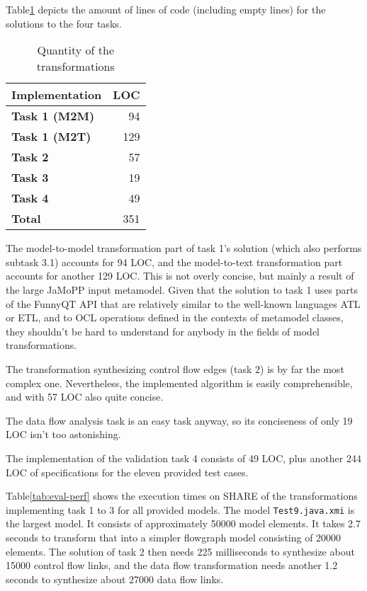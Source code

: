 \documentclass[11pt]{article}
\begin{document}
Table\ref{tab:eval-quantity} depicts the amount of lines of code (including
empty lines) for the solutions to the four tasks.

\begin{table}[h!]
  \centering
  \begin{tabular}{| l | r |}
    \hline
    \textbf{Implementation} & \textbf{LOC}\\
    \hline
    \textbf{Task 1 (M2M)} & 94\\
    \textbf{Task 1 (M2T)} & 129\\
    \textbf{Task 2} & 57\\
    \textbf{Task 3} & 19\\
    \textbf{Task 4} & 49\\
    \hline
    \textbf{Total} & 351\\
    \hline
  \end{tabular}
  \caption{Quantity of the transformations}
  \label{tab:eval-quantity}
\end{table}

The model-to-model transformation part of task 1's solution (which also
performs subtask 3.1) accounts for 94 LOC, and the model-to-text transformation
part accounts for another 129 LOC.  This is not overly concise, but mainly a
result of the large JaMoPP input metamodel.  Given that the solution to task 1
uses parts of the FunnyQT API that are relatively similar to the well-known
languages ATL or ETL, and to OCL operations defined in the contexts of
metamodel classes, they shouldn't be hard to understand for anybody in the
fields of model transformations.

The transformation synthesizing control flow edges (task 2) is by far the most
complex one.  Nevertheless, the implemented algorithm is easily comprehensible,
and with 57 LOC also quite concise.

The data flow analysis task is an easy task anyway, so its conciseness of only
19 LOC isn't too astonishing.

The implementation of the validation task 4 consists of 49 LOC, plus another
244 LOC of specifications for the eleven provided test cases.

Table\ref{tab:eval-perf} shows the execution times on SHARE of the
transformations implementing task 1 to 3 for all provided models.  The model
\verb|Test9.java.xmi| is the largest model.  It consists of approximately 50000
model elements.  It takes 2.7 seconds to transform that into a simpler
flowgraph model consisting of 20000 elements.  The solution of task 2 then
needs 225 milliseconds to synthesize about 15000 control flow links, and the
data flow transformation needs another 1.2 seconds to synthesize about 27000
data flow links.
\end{document}
